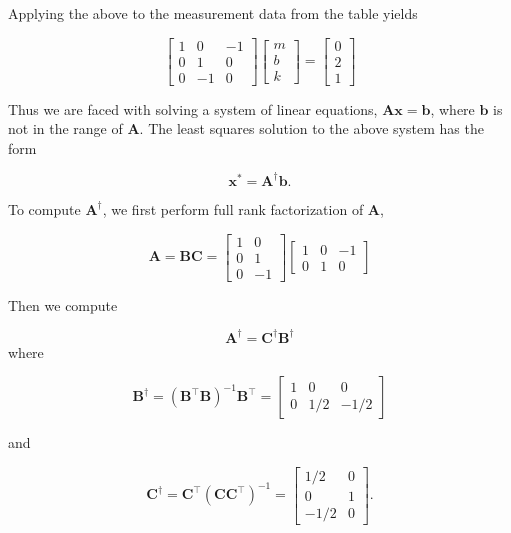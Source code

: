 Applying the above to the measurement data from the table yields

\[
	\left[\begin{array}{ccc}
		1 & 0 & -1 \\
		0 & 1 & 0 \\
		0 & -1 & 0
	\end{array}\right]\left[\begin{array}{c}
		m \\
		b \\
		k
	\end{array}\right]=\left[\begin{array}{l}
		0 \\
		2 \\
		1
	\end{array}\right]
\]

Thus we are faced with solving a system of linear equations, \(\boldsymbol{A} \boldsymbol{x}=\boldsymbol{b}\), where \(\boldsymbol{b}\) is not in the range of \(\boldsymbol{A}\). The least squares solution to the above system has the form

\[
	\boldsymbol{x}^{*}=\boldsymbol{A}^{\dagger} \boldsymbol{b} .
\]

To compute \(\boldsymbol{A}^{\dagger}\), we first perform full rank factorization of \(\boldsymbol{A}\),

\[
	\boldsymbol{A}=\boldsymbol{B} \boldsymbol{C}=\left[\begin{array}{cc}
		1 & 0 \\
		0 & 1 \\
		0 & -1
	\end{array}\right]\left[\begin{array}{ccc}
		1 & 0 & -1 \\
		0 & 1 & 0
	\end{array}\right]
\]

Then we compute

\[
	\boldsymbol{A}^{\dagger}=\boldsymbol{C}^{\dagger} \boldsymbol{B}^{\dagger}
\]
where

\[
	\boldsymbol{B}^{\dagger}=\left(\boldsymbol{B}^{\top} \boldsymbol{B}\right)^{-1} \boldsymbol{B}^{\top}=\left[\begin{array}{ccc}
		1 & 0 & 0 \\
		0 & 1 / 2 & -1 / 2
	\end{array}\right]
\]

and

\[
	\boldsymbol{C}^{\dagger}=\boldsymbol{C}^{\top}\left(\boldsymbol{C} \boldsymbol{C}^{\top}\right)^{-1}=\left[\begin{array}{cc}
		1 / 2 & 0 \\
		0 & 1 \\
		-1 / 2 & 0
	\end{array}\right] .
\]

